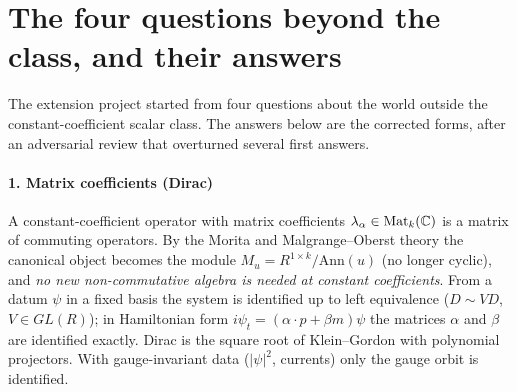 \section{The four questions beyond the class, and their answers}\label{sec:questions}
The extension project started from four questions about the world outside the constant-coefficient scalar class. The answers below are the corrected forms, after an adversarial review that overturned several first answers.

\paragraph{1. Matrix coefficients (Dirac)} A constant-coefficient operator with matrix coefficients $\lambda_\alpha\in\mathrm{Mat}_k(\mathbb{C})$ is a matrix of commuting operators. By the Morita and Malgrange--Oberst theory the canonical object becomes the module $M_u=R^{1\times k}/\mathrm{Ann}(u)$ (no longer cyclic), and \emph{no new non-commutative algebra is needed at constant coefficients}.
From a datum $\psi$ in a fixed basis the system is identified up to left equivalence ($D\sim VD$, $V\in GL(R)$); in Hamiltonian form $i\psi_t=(\alpha\cdot p+\beta m)\psi$ the matrices $\alpha$ and $\beta$ are identified exactly. Dirac is the square root of Klein--Gordon with polynomial projectors. With gauge-invariant data ($\lvert\psi\rvert^2$, currents) only the gauge orbit is identified.

